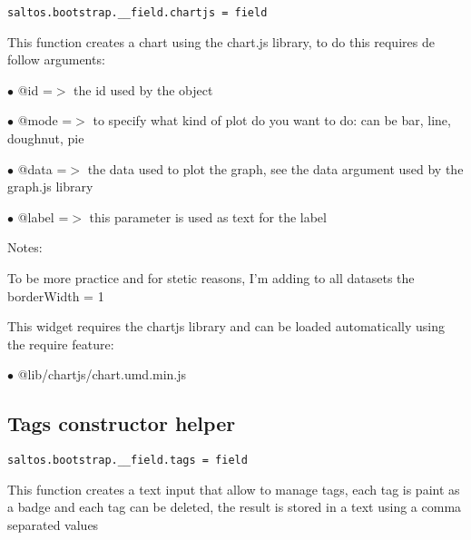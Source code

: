 \documentclass[a4paper]{book}
\begin{document}
\begin{lstlisting}
saltos.bootstrap.__field.chartjs = field
\end{lstlisting}

This function creates a chart using the chart.js library, to do this requires de follow arguments:

\begin{compactitem}
\item[\color{myblue}$\bullet$] @id    =$>$ the id used by the object
\item[\color{myblue}$\bullet$] @mode  =$>$ to specify what kind of plot do you want to do: can be bar, line, doughnut, pie
\item[\color{myblue}$\bullet$] @data  =$>$ the data used to plot the graph, see the data argument used by the graph.js library
\item[\color{myblue}$\bullet$] @label =$>$ this parameter is used as text for the label
\end{compactitem}

Notes:

To be more practice and for stetic reasons, I'm adding to all datasets the borderWidth = 1

This widget requires the chartjs library and can be loaded automatically using the require
feature:

\begin{compactitem}
\item[\color{myblue}$\bullet$] @lib/chartjs/chart.umd.min.js
\end{compactitem}

\hypertarget{toc488}{}
\subsection{Tags constructor helper}

\begin{lstlisting}
saltos.bootstrap.__field.tags = field
\end{lstlisting}

This function creates a text input that allow to manage tags, each tag is paint as a badge
and each tag can be deleted, the result is stored in a text using a comma separated values
\end{document}
